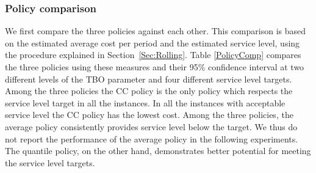 \documentclass[msom]{oo}
\begin{document}








\subsubsection{Policy comparison}

We first compare the three policies against each other.
This comparison is based on the estimated average cost per period and the estimated service level, using the procedure explained in Section~\ref{Sec:Rolling}. Table \ref{PolicyComp} compares the three policies using these measures and their 95\% confidence interval at two different levels of the TBO parameter and four different service level targets. 
Among the three policies the CC policy is the only policy which respects the service level target in all the instances. In all the instances with acceptable service level the CC policy has the lowest cost. Among the three policies, the average policy consistently provides service level below the target.  We thus do not report the performance of the average policy in the following experiments. The quantile policy, on the other hand, demonstrates better potential for meeting the service level targets.
\end{document}
